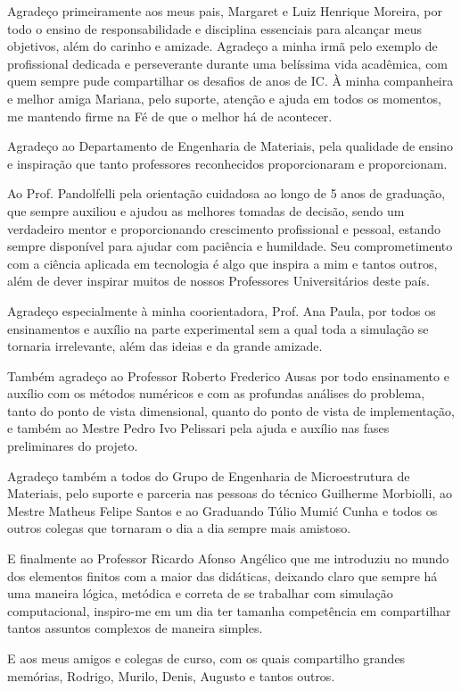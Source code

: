 \documentclass[
	12pt,				%
	openrany,			%
	oneside,			%
	a4paper,			%
	chapter=TITLE,		%
	english,			%
	french,				%
	spanish,			%
	brazil,				%
	hyphens,
  oldfontcommands]{abntex2}
\theoremstyle{definition}
\theoremstyle{definition}
\begin{document}
\begin{agradecimentos}

Agradeço primeiramente aos meus pais, Margaret e Luiz Henrique Moreira, por todo o ensino de
responsabilidade e disciplina essenciais para alcançar meus objetivos, além do
carinho e amizade. Agradeço a minha irmã pelo exemplo de profissional dedicada e
perseverante durante uma belíssima vida acadêmica, com quem sempre pude
compartilhar os desafios de anos de IC. À minha companheira e melhor amiga
Mariana, pelo suporte, atenção e ajuda em todos os momentos, me mantendo firme
na Fé de que o melhor há de acontecer.

Agradeço ao Departamento de Engenharia de Materiais, pela qualidade de ensino e
inspiração que tanto professores reconhecidos proporcionaram e proporcionam.

Ao Prof. Pandolfelli pela orientação cuidadosa ao longo de 5 anos de graduação, que sempre
auxiliou e ajudou as melhores tomadas de decisão, sendo um verdadeiro mentor e proporcionando
crescimento profissional e pessoal, estando sempre disponível para ajudar com
paciência e humildade. Seu comprometimento com a ciência aplicada em tecnologia
é algo que inspira a mim e tantos outros, além de dever inspirar muitos de
nossos Professores Universitários deste país.

Agradeço especialmente à minha coorientadora, Prof. Ana Paula, por todos os
ensinamentos e auxílio na parte experimental sem a qual toda a simulação se
tornaria irrelevante, além das ideias e da grande amizade.

Também agradeço ao Professor Roberto Frederico Ausas por todo ensinamento e
auxílio com os métodos numéricos e com as profundas análises do problema, tanto
do ponto de vista dimensional, quanto do ponto de vista de implementação, e
também ao Mestre Pedro Ivo Pelissari pela ajuda e auxílio nas fases preliminares
do projeto.

Agradeço também a todos do Grupo de Engenharia de Microestrutura de Materiais,
pelo suporte e parceria nas pessoas do técnico Guilherme Morbiolli, ao Mestre
Matheus Felipe Santos e ao Graduando Túlio Mumi\'c Cunha e todos os outros
colegas que tornaram o dia a dia sempre mais amistoso.

E finalmente ao Professor Ricardo Afonso Angélico que me introduziu no mundo dos elementos
finitos com a maior das didáticas, deixando claro que sempre há uma maneira
lógica, metódica e correta de se trabalhar com simulação computacional,
inspiro-me em um dia ter tamanha competência em compartilhar tantos assuntos
complexos de maneira simples.

E aos meus amigos e colegas de curso, com os quais compartilho grandes memórias,
Rodrigo, Murilo, Denis, Augusto e tantos outros. 

\end{agradecimentos}
\end{document}
